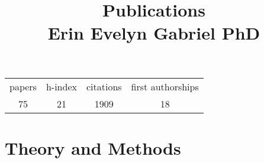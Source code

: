 \documentclass[12pt]{article}
\title{Publications \\ Erin Evelyn Gabriel PhD}
\date{}
\begin{document}
\maketitle

\vspace{-2cm}
\begin{table}[h]
    \centering
    \begin{tabular}{c|c|c|c}
     papers&h-index&citations&first authorships\\
     75&21&1909&18\\
    \end{tabular}

\end{table}



\section*{Theory and Methods}
\end{document}
